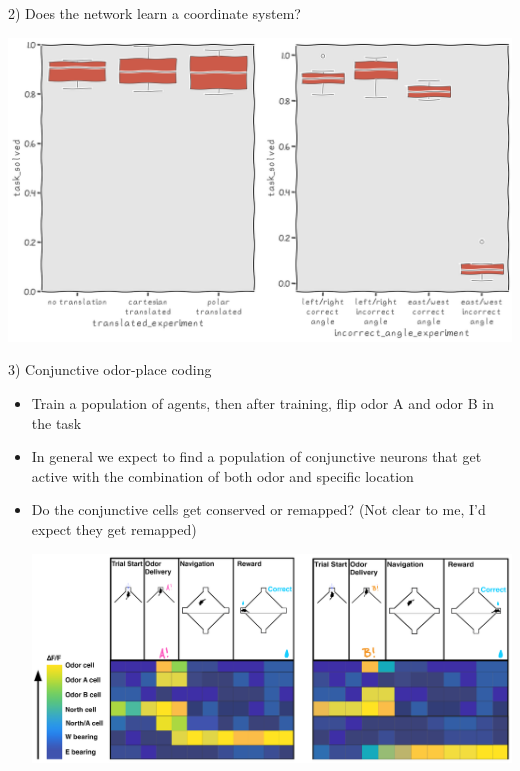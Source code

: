 \documentclass[bigger]{beamer}
\begin{document}
\begin{frame}[label={sec:org49d07f6}]{2) Does the network learn a coordinate system?}
\begin{center}
\includegraphics[width=.9\linewidth]{img/exp2-boxplot.png}
\end{center}
\end{frame}
\begin{frame}[<+->][label={sec:org4674001}]{3) Conjunctive odor-place coding}
\begin{itemize}
\item Train a population of agents, then after training, flip odor A and odor B in the task
\item In general we expect to find a population of conjunctive neurons that get active with the combination of both odor and specific location
\item Do the conjunctive cells get conserved or remapped? (Not clear to me, I'd expect they get remapped)
\begin{center}
\includegraphics[width=.9\linewidth]{img/cell-types.png}
\end{center}
\end{itemize}
\end{frame}
\end{document}
